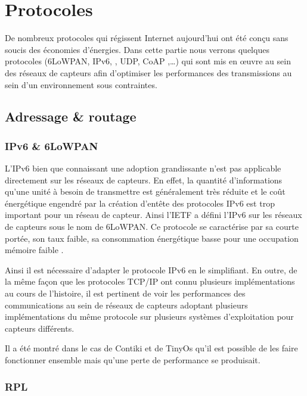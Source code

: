 \section{Protocoles}

De nombreux protocoles qui régissent Internet aujourd'hui ont été conçu sans
soucis des économies d'énergies.  Dans cette partie nous verrons quelques
protocoles (6LoWPAN, IPv6, \cite{ipv6}, UDP, CoAP \cite{coap},\ldots) qui sont
mis en œuvre au sein des réseaux de capteurs afin d'optimiser les performances
des transmissions au sein d'un environnement sous contraintes.


\subsection{Adressage \& routage}

\subsubsection{IPv6 \& 6LoWPAN}

L'IPv6 bien que connaissant une adoption grandissante n'est pas applicable
directement sur les réseaux de capteurs. En effet, la quantité d'informations
qu'une unité à besoin de transmettre est généralement très réduite et le coût
énergétique engendré par la création d'entête des protocoles IPv6 est trop
important pour un réseau de capteur. Ainsi l'IETF a défini l'IPv6 sur les
réseaux de capteurs sous le nom de 6LoWPAN. Ce protocole se caractérise par sa
courte portée, son taux faible, sa consommation énergétique basse pour une
occupation mémoire faible \cite{Srinivasan06someimplications}.

Ainsi il est nécessaire d'adapter le protocole IPv6 en le simplifiant. En
outre, de la même façon que les protocoles TCP/IP ont connu plusieurs
implémentations au cours de l'histoire, il est pertinent de voir les
performances des communications au sein de réseaux de capteurs adoptant
plusieurs implémentations du même protocole sur plusieurs systèmes
d'exploitation pour capteurs différents.  \cite{dunkels11adhoc, dunkels09ercim,
ipv6}

Il a été montré dans le cas de Contiki et de TinyOs qu'il est possible de les
faire fonctionner ensemble mais qu'une perte de performance se produisait.

\subsubsection{RPL}


